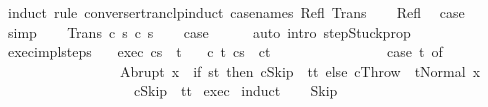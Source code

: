 \begin{isabellebody}
\ {\isacharparenleft}induct\ rule{\isacharcolon}\ converse{\isacharunderscore}rtranclp{\isacharunderscore}induct{}\ {\isacharbrackleft}case{\isacharunderscore}names\ Refl\ Trans{\isacharbrackright}{\isacharparenright}\isanewline
\ \ \isamarkupfalse%
\ Refl\ \isamarkupfalse%
\ {\isacharquery}case\ \isamarkupfalse%
\ simp\isanewline
{}\isamarkupfalse%
\isanewline
\ \ \isamarkupfalse%
\ {\isacharparenleft}Trans\ c\ s\ c{\isacharprime}{\isacharprime}\ s{\isacharprime}{\isacharprime}{\isacharparenright}\isanewline
\ \ \isamarkupfalse%
\ {\isacharquery}case\isanewline
\ \ \ \ \isamarkupfalse%
\ {\isacharparenleft}auto\ intro{\isacharcolon}\ step{\isacharunderscore}Stuck{\isacharunderscore}prop{\isacharparenright}\isanewline
{}\isamarkupfalse%
%
\endisatagproof
{\isafoldproof}%
%
\isadelimproof
%
\endisadelimproof
%
\isamarkuptrue%
\isamarkupfalse%
\ exec{\isacharunderscore}impl{\isacharunderscore}steps{\isacharcolon}\isanewline
\ \ \ exec{\isacharcolon}\ {\isachardoublequoteopen}{\isasymGamma}{\isasymturnstile}{\isasymlangle}c{\isacharcomma}s{\isasymrangle}\ {\isasymRightarrow}\ t{\isachardoublequoteclose}\isanewline
\ \ \ {\isachardoublequoteopen}{\isasymexists}c{\isacharprime}\ t{\isacharprime}{\isachardot}\ {\isasymGamma}{\isasymturnstile}{\isacharparenleft}c{\isacharcomma}s{\isacharparenright}\ {\isasymrightarrow}\isactrlsup {\isacharasterisk}\ {\isacharparenleft}c{\isacharprime}{\isacharcomma}t{\isacharprime}{\isacharparenright}\ {\isasymand}\isanewline
\ \ \ \ \ \ \ \ \ \ \ \ \ \ \ {\isacharparenleft}case\ t\ of\isanewline
\ \ \ \ \ \ \ \ \ \ \ \ \ \ \ \ \ Abrupt\ x\ {\isasymRightarrow}\ if\ s{\isacharequal}t\ then\ c{\isacharprime}{\isacharequal}Skip\ {\isasymand}\ t{\isacharprime}{\isacharequal}t\ else\ c{\isacharprime}{\isacharequal}Throw\ {\isasymand}\ t{\isacharprime}{\isacharequal}Normal\ x\isanewline
\ \ \ \ \ \ \ \ \ \ \ \ \ \ \ \ {\isacharbar}\ {\isacharunderscore}\ {\isasymRightarrow}\ c{\isacharprime}{\isacharequal}Skip\ {\isasymand}\ t{\isacharprime}{\isacharequal}t{\isacharparenright}{\isachardoublequoteclose}\isanewline
%
\isadelimproof
%
\endisadelimproof
%
\isatagproof
{}\isamarkupfalse%
\ exec\isanewline
{}\isamarkupfalse%
\ {\isacharparenleft}induct{\isacharparenright}\isanewline
\ \ \isamarkupfalse%
\ Skip\ \isamarkupfalse%

\end{isabellebody}
